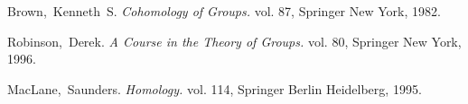 \begin{thebibliography}{99}


Brown,~Kenneth~S. \textit{Cohomology of Groups.} vol. 87, Springer New York, 1982.

Robinson,~Derek. \textit{A Course in the Theory of Groups.} vol. 80, Springer New York, 1996.

MacLane,~Saunders. \textit{Homology.} vol. 114, Springer Berlin Heidelberg, 1995.

\end{thebibliography} 